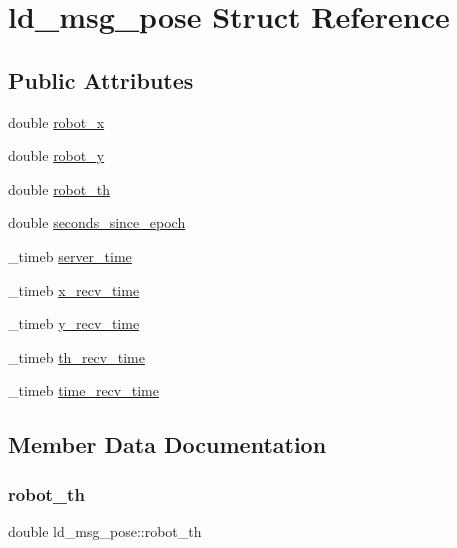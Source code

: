 \hypertarget{structld__msg__pose}{}\section{ld\+\_\+msg\+\_\+pose Struct Reference}
\label{structld__msg__pose}
\subsection*{Public Attributes}
\begin{DoxyCompactItemize}
\item 
double \hyperlink{structld__msg__pose_a30c84490978ccf4a9092a15346d5cac0}{robot\+\_\+x}
\item 
double \hyperlink{structld__msg__pose_ad0b8cca5ea09c38753c6b37197de67c4}{robot\+\_\+y}
\item 
double \hyperlink{structld__msg__pose_a0bc12453bebcdb0a0052149bfe585367}{robot\+\_\+th}
\item 
double \hyperlink{structld__msg__pose_ad26937c8008680739f207cbc0d76c003}{seconds\+\_\+since\+\_\+epoch}
\item 
\+\_\+timeb \hyperlink{structld__msg__pose_a812b4a4a731bc33b0a356b1340610e28}{server\+\_\+time}
\item 
\+\_\+timeb \hyperlink{structld__msg__pose_a4a4636747213a18e34dc05b5ea964dfd}{x\+\_\+recv\+\_\+time}
\item 
\+\_\+timeb \hyperlink{structld__msg__pose_a1ab8f32a7a2edd172e33057719dbe9e9}{y\+\_\+recv\+\_\+time}
\item 
\+\_\+timeb \hyperlink{structld__msg__pose_acf025c0af4d2a3195c42d9ca133d3e74}{th\+\_\+recv\+\_\+time}
\item 
\+\_\+timeb \hyperlink{structld__msg__pose_a68a03febea822176935f8e14f1897b54}{time\+\_\+recv\+\_\+time}
\end{DoxyCompactItemize}


\subsection{Member Data Documentation}
\mbox{\label{structld__msg__pose_a0bc12453bebcdb0a0052149bfe585367}} 
\subsubsection{\texorpdfstring{robot\+\_\+th}{robot\_th}}
{\footnotesize\ttfamily double ld\+\_\+msg\+\_\+pose\+::robot\+\_\+th}

